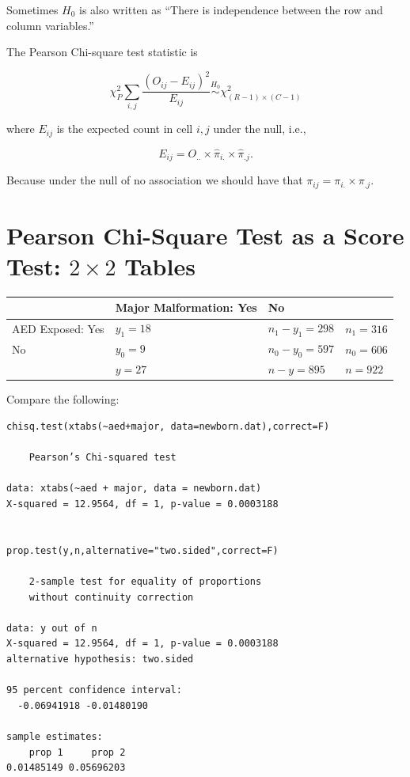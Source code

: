 \documentclass[
  letterpaper,
  DIV=11,
  numbers=noendperiod]{scrreport}
\begin{document}
Sometimes \(H_0\) is also written as ``There is independence between the
row and column variables.''

The Pearson Chi-square test statistic is

\[\chi_P^2  \sum_{i,j} \frac{(O_{ij} - E_{ij})^2}{E_{ij}} \stackrel{H_0}\sim \chi_{(R-1) \times (C-1)}^2
\]

where \(E_{ij}\) is the expected count in cell \(i,j\) under the null,
i.e.,

\[E_{ij} = O_{..} \times \hat \pi_{i.} \times \hat \pi_{.j}.
\]

Because under the null of no association we should have that
\(\pi_{ij} = \pi_{i.} \times \pi_{.j}.\)

\hypertarget{pearson-chi-square-test-as-a-score-test-2-times-2-tables}{%
\section{\texorpdfstring{Pearson Chi-Square Test as a Score Test:
\(2 \times 2\)
Tables}{Pearson Chi-Square Test as a Score Test: 2 \textbackslash times 2 Tables}}\label{pearson-chi-square-test-as-a-score-test-2-times-2-tables}}

\begin{longtable}[]{@{}llll@{}}
\toprule()
& Major Malformation: Yes & No & \\
\midrule()
\endhead
AED Exposed: Yes & \(y_1 = 18\) & \(n_1 - y_1 = 298\) & \(n_1 = 316\) \\
No & \(y_0 = 9\) & \(n_0 - y_0 = 597\) & \(n_0 = 606\) \\
& \(y = 27\) & \(n- y = 895\) & \(n = 922\) \\
\bottomrule()
\end{longtable}

Compare the following:

\begin{verbatim}
chisq.test(xtabs(~aed+major, data=newborn.dat),correct=F)

    Pearson’s Chi-squared test

data: xtabs(~aed + major, data = newborn.dat)
X-squared = 12.9564, df = 1, p-value = 0.0003188


prop.test(y,n,alternative="two.sided",correct=F)

    2-sample test for equality of proportions
    without continuity correction

data: y out of n
X-squared = 12.9564, df = 1, p-value = 0.0003188
alternative hypothesis: two.sided

95 percent confidence interval:
  -0.06941918 -0.01480190

sample estimates:
    prop 1     prop 2
0.01485149 0.05696203
\end{verbatim}
\end{document}
